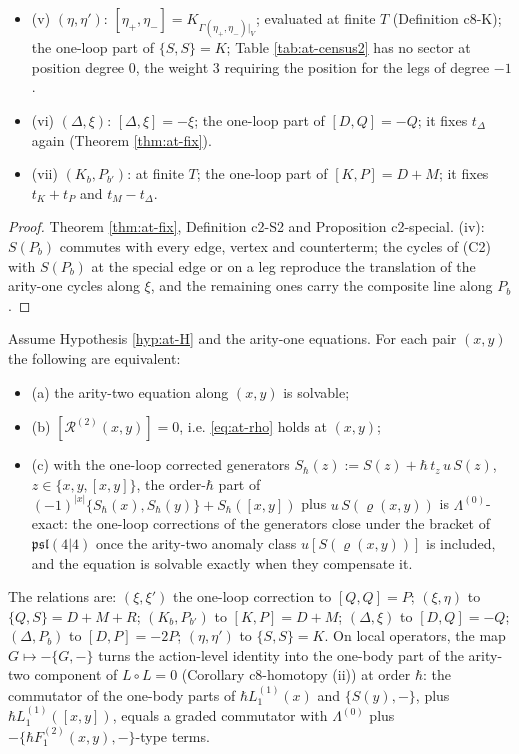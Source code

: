 \begin{proposition}
\begin{itemize}
\item (v) $(\eta,\eta')$: $[\eta_+,\eta_-]=K_{\Gamma(\eta_+,\eta_-)|_V}$; evaluated at finite $T$ (Definition c8-K); the one-loop part of $\{S,S\}=K$; Table \ref{tab:at-census2} has no sector at position degree $0$, the weight $3$ requiring the position for the legs of degree $-1$.
\item (vi) $(\Delta,\xi)$: $[\Delta,\xi]=-\xi$; the one-loop part of $[D,Q]=-Q$; it fixes $t_\Delta$ again (Theorem \ref{thm:at-fix}).
\item (vii) $(K_b,P_{b'})$: at finite $T$; the one-loop part of $[K,P]=D+M$; it fixes $t_K+t_P$ and $t_M-t_\Delta$.
\end{itemize}
\end{proposition}

\begin{proof}
Theorem \ref{thm:at-fix}, Definition c2-S2 and Proposition c2-special. (iv): $S(P_b)$ commutes with every edge, vertex and counterterm; the cycles of (C2) with $S(P_b)$ at the special edge or on a leg reproduce the translation of the arity-one cycles along $\xi$, and the remaining ones carry the composite line along $P_b$.
\end{proof}

\begin{theorem}
\label{thm:at-algebra}
Assume Hypothesis \ref{hyp:at-H} and the arity-one equations. For each pair $(x,y)$ the following are equivalent:
\begin{itemize}
\item (a) the arity-two equation along $(x,y)$ is solvable;
\item (b) $[\mathcal R^{(2)}(x,y)]=0$, i.e. \eqref{eq:at-rho} holds at $(x,y)$;
\item (c) with the one-loop corrected generators $S_\hbar(z):=S(z)+\hbar\,t_z\,u\,S(z)$, $z\in\{x,y,[x,y]\}$, the order-$\hbar$ part of $(-1)^{|x|}\{S_\hbar(x),S_\hbar(y)\}+S_\hbar([x,y])$ plus $u\,S(\varrho(x,y))$ is $\Lambda^{(0)}$-exact: the one-loop corrections of the generators close under the bracket of $\mathfrak{psl}(4|4)$ once the arity-two anomaly class $u[S(\varrho(x,y))]$ is included, and the equation is solvable exactly when they compensate it.
\end{itemize}
The relations are: $(\xi,\xi')$ the one-loop correction to $[Q,Q]=P$; $(\xi,\eta)$ to $\{Q,S\}=D+M+R$; $(K_b,P_{b'})$ to $[K,P]=D+M$; $(\Delta,\xi)$ to $[D,Q]=-Q$; $(\Delta,P_b)$ to $[D,P]=-2P$; $(\eta,\eta')$ to $\{S,S\}=K$. On local operators, the map $G\mapsto-\{G,-\}$ turns the action-level identity into the one-body part of the arity-two component of $L\circ L=0$ (Corollary c8-homotopy (ii)) at order $\hbar$: the commutator of the one-body parts of $\hbar L_1^{(1)}(x)$ and $\{S(y),-\}$, plus $\hbar L_1^{(1)}([x,y])$, equals a graded commutator with $\Lambda^{(0)}$ plus $-\{\hbar F_1^{(2)}(x,y),-\}$-type terms.
\end{theorem}

